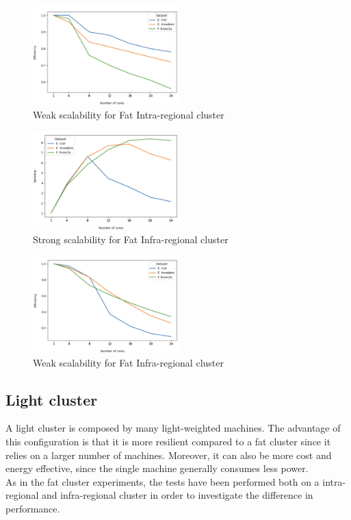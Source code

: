 \documentclass[final,5p,times,twocolumn,authoryear]{elsarticle}
\begin{document}
\begin{figure}
    \centering
    \includegraphics[width=0.5\textwidth]{images/fat_intra_weak.png}
    \caption{Weak scalability for Fat Intra-regional cluster }
    \label{fig:fat-intra-weak}
\end{figure}
\begin{figure}
    \centering
    \includegraphics[width=0.5\textwidth]{images/fat_infra_strong.png}
    \caption{Strong scalability for Fat Infra-regional cluster }
    \label{fig:fat-infra-strong}
\end{figure}
\begin{figure}
    \centering
    \includegraphics[width=0.5\textwidth]{images/fat_infra_weak.png}
    \caption{Weak scalability for Fat Infra-regional cluster }
    \label{fig:fat-infra-weak}
\end{figure}

\subsection{Light cluster}
A light cluster is composed by many light-weighted machines. The advantage of this configuration is that it is more resilient compared to a fat cluster since it relies on a larger number of machines. Moreover, it can also be more cost and energy effective, since the single machine generally consumes less power. \\
As in the fat cluster experiments, the tests have been performed both on a intra-regional and infra-regional cluster in order to investigate the difference in performance. 
\end{document}
